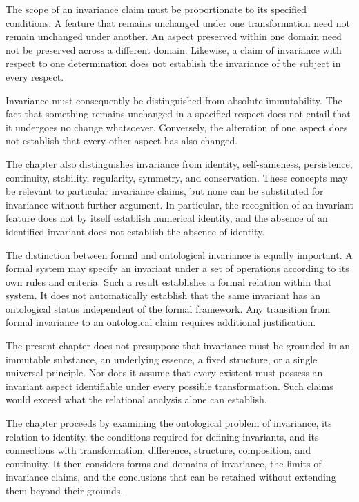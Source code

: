 The scope of an invariance claim must be proportionate to
its specified conditions. A feature that remains unchanged
under one transformation need not remain unchanged under
another. An aspect preserved within one domain need not be
preserved across a different domain. Likewise, a claim of
invariance with respect to one determination does not establish
the invariance of the subject in every respect.

Invariance must consequently be distinguished from absolute
immutability. The fact that something remains unchanged in
a specified respect does not entail that it undergoes no
change whatsoever. Conversely, the alteration of one aspect
does not establish that every other aspect has also changed.

The chapter also distinguishes invariance from identity,
self-sameness, persistence, continuity, stability, regularity,
symmetry, and conservation. These concepts may be relevant
to particular invariance claims, but none can be substituted
for invariance without further argument. In particular,
the recognition of an invariant feature does not by itself
establish numerical identity, and the absence of an identified
invariant does not establish the absence of identity.

The distinction between formal and ontological invariance
is equally important. A formal system may specify an invariant
under a set of operations according to its own rules and
criteria. Such a result establishes a formal relation within
that system. It does not automatically establish that the
same invariant has an ontological status independent of
the formal framework. Any transition from formal invariance
to an ontological claim requires additional justification.

The present chapter does not presuppose that invariance
must be grounded in an immutable substance, an underlying
essence, a fixed structure, or a single universal principle.
Nor does it assume that every existent must possess an
invariant aspect identifiable under every possible
transformation. Such claims would exceed what the relational
analysis alone can establish.

The chapter proceeds by examining the ontological problem
of invariance, its relation to identity, the conditions
required for defining invariants, and its connections with
transformation, difference, structure, composition, and
continuity. It then considers forms and domains of invariance,
the limits of invariance claims, and the conclusions that
can be retained without extending them beyond their grounds.

